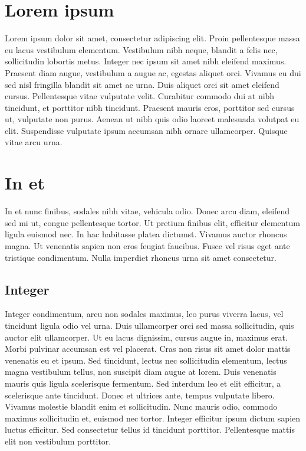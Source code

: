 \graphicspath{ {images_thesis/} }
\section{Lorem ipsum}
Lorem ipsum dolor sit amet, consectetur adipiscing elit. Proin pellentesque massa eu lacus vestibulum elementum. Vestibulum nibh neque, blandit a felis nec, sollicitudin lobortis metus. Integer nec ipsum sit amet nibh eleifend maximus. Praesent diam augue, vestibulum a augue ac, egestas aliquet orci. Vivamus eu dui sed nisl fringilla blandit sit amet ac urna. Duis aliquet orci sit amet eleifend cursus. Pellentesque vitae vulputate velit. Curabitur commodo dui at nibh tincidunt, et porttitor nibh tincidunt. Praesent mauris eros, porttitor sed cursus ut, vulputate non purus. Aenean ut nibh quis odio laoreet malesuada volutpat eu elit. Suspendisse vulputate ipsum accumsan nibh ornare ullamcorper. Quisque vitae arcu urna.
\section{In et}
In et nunc finibus, sodales nibh vitae, vehicula odio. Donec arcu diam, eleifend sed mi ut, congue pellentesque tortor. Ut pretium finibus elit, efficitur elementum ligula euismod nec. In hac habitasse platea dictumst. Vivamus auctor rhoncus magna. Ut venenatis sapien non eros feugiat faucibus. Fusce vel risus eget ante tristique condimentum. Nulla imperdiet rhoncus urna sit amet consectetur.
\subsection{Integer}
Integer condimentum, arcu non sodales maximus, leo purus viverra lacus, vel tincidunt ligula odio vel urna. Duis ullamcorper orci sed massa sollicitudin, quis auctor elit ullamcorper. Ut eu lacus dignissim, cursus augue in, maximus erat. Morbi pulvinar accumsan est vel placerat. Cras non risus sit amet dolor mattis venenatis eu et ipsum. Sed tincidunt, lectus nec sollicitudin elementum, lectus magna vestibulum tellus, non suscipit diam augue at lorem. Duis venenatis mauris quis ligula scelerisque fermentum. Sed interdum leo et elit efficitur, a scelerisque ante tincidunt. Donec et ultrices ante, tempus vulputate libero. Vivamus molestie blandit enim et sollicitudin. Nunc mauris odio, commodo maximus sollicitudin et, euismod nec tortor. Integer efficitur ipsum dictum sapien luctus efficitur. Sed consectetur tellus id tincidunt porttitor. Pellentesque mattis elit non vestibulum porttitor.
